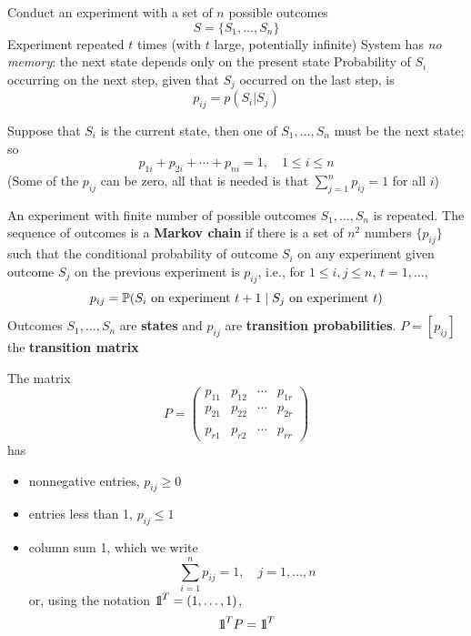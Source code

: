 \documentclass[aspectratio=169]{beamer}\usepackage[]{graphicx}\usepackage[]{xcolor}
\begin{document}
\begin{frame}
Conduct an experiment with a set of $n$ possible outcomes
\[
S=\{S_1,\dots, S_n\}
\]
\vfill
Experiment repeated $t$ times (with $t$ large, potentially infinite)
\vfill 
System has \emph{no memory}: the next state depends only on the present state
\vfill
Probability of $S_i$ occurring on the next step, given that $S_j$ occurred on the last step, is
\[
p_{ij}=p(S_i|S_j)
\]
\end{frame}


\begin{frame} 
Suppose that $S_i$ is the current state, then one of $S_1, \ldots,S_n$ must be the next state; so
\[
p_{1i}+p_{2i}+\cdots+p_{ni}=1, \quad 1\leq i\leq n
\]
(Some of the $p_{ij}$ can be zero, all that is needed is that $\sum_{j=1}^n p_{ij}=1$ for all $i$)
\vfill
\begin{definition}
An experiment with finite number of possible outcomes $S_1,\ldots,S_n$ is repeated. The sequence of outcomes is a \textbf{Markov chain} if there is a set of $n^2$ numbers $\{p_{ij}\}$ such that the conditional probability of outcome $S_i$ on any experiment given outcome $S_j$ on the previous experiment is $p_{ij}$, i.e., for $1\leq i,j\leq n$, $t=1,\ldots$,
\[
	p_{ij}=\mathbb{P}(S_i\textrm{ on experiment }t+1\;|\;
	S_j\textrm{ on experiment }t)	
\]
Outcomes $S_1,\ldots,S_n$ are \textbf{states} and $p_{ij}$ are \textbf{transition probabilities}. $P=[p_{ij}]$ the \textbf{transition matrix}
\end{definition}
\end{frame}


\begin{frame} 
The matrix 
\[
P=
\begin{pmatrix}
p_{11} & p_{12} & \cdots & p_{1r} \\
p_{21} & p_{22} & \cdots & p_{2r} \\
&&& \\
p_{r1} & p_{r2} & \cdots & p_{rr}
\end{pmatrix}
\]
has
\begin{itemize}
\item nonnegative entries, $p_{ij}\geq 0$
\item entries less than 1, $p_{ij}\leq 1$
\item column sum 1, which we write
\[
\sum_{i=1}^n p_{ij}=1,\quad j=1,\ldots,n
\]
or, using the notation $\nbOne^T=(1,\ldots,1)$,
\[
\nbOne^TP=\nbOne^T
\]
\end{itemize}
\end{frame}
\end{document}
